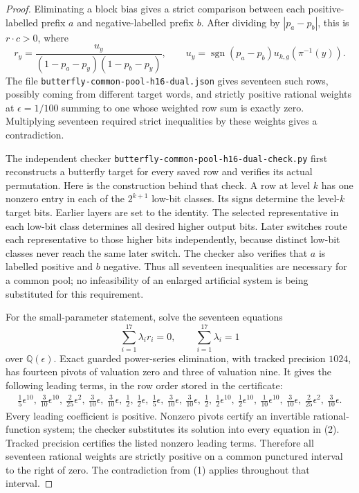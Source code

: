 \documentclass[11pt]{article}
\begin{document}
\begin{proof}
Eliminating a block bias gives a strict comparison between each
positive-labelled prefix $a$ and negative-labelled prefix $b$.
After dividing by $|p_a-p_b|$, this is $r\cdot c>0$, where
\[
 r_y=\frac{u_y}{(1-p_a-p_y)(1-p_b-p_y)},\qquad
 u_y=\operatorname{sgn}(p_a-p_b)
       u_{k,g}(\pi^{-1}(y)).                                  \tag{1}
\]
The file \texttt{butterfly-common-pool-h16-dual.json} gives seventeen
such rows, possibly coming from different target words, and strictly
positive rational weights at $\epsilon=1/100$ summing to one whose
weighted row sum is exactly zero. Multiplying seventeen required
strict inequalities by these weights gives a contradiction.

The independent checker
\texttt{butterfly-common-pool-h16-dual-check.py} first reconstructs a
butterfly target for every saved row and verifies its actual permutation.
Here is the construction behind that check. A row at level $k$ has one
nonzero entry in each of the $2^{k+1}$ low-bit classes. Its signs determine
the level-$k$ target bits. Earlier layers are set to the identity.
The selected representative in each low-bit class determines all desired
higher output bits. Later switches route each representative to those
higher bits independently, because distinct low-bit classes never reach
the same later switch. The checker also verifies that $a$ is labelled
positive and $b$ negative. Thus all seventeen inequalities are necessary
for a common pool; no infeasibility of an enlarged artificial system is
being substituted for this requirement.

For the small-parameter statement, solve the seventeen equations
\[
 \sum_{i=1}^{17}\lambda_i r_i=0,\qquad
 \sum_{i=1}^{17}\lambda_i=1                                  \tag{2}
\]
over $\mathbb Q(\epsilon)$. Exact guarded power-series elimination,
with tracked precision $1024$, has fourteen pivots of valuation zero
and three of valuation nine. It gives the following leading terms,
in the row order stored in the certificate:
\[
\begin{gathered}
 \tfrac15\epsilon^{10},\ \tfrac3{10}\epsilon^{10},\
 \tfrac2{25}\epsilon^2,\ \tfrac3{10}\epsilon,\
 \tfrac3{10}\epsilon,\ \tfrac12,\ \tfrac12\epsilon,\
 \tfrac15\epsilon,\ \tfrac3{10}\epsilon,\
 \tfrac3{10}\epsilon,\ \tfrac12,\ \tfrac12\epsilon^{10},\
 \tfrac12\epsilon^{10},\ \tfrac1{10}\epsilon^{10},\
 \tfrac3{10}\epsilon,\ \tfrac2{25}\epsilon^2,\
 \tfrac3{10}\epsilon.
\end{gathered}
\]
Every leading coefficient is positive. Nonzero pivots certify an
invertible rational-function system; the checker substitutes its
solution into every equation in (2). Tracked precision certifies the
listed nonzero leading terms. Therefore all seventeen rational weights
are strictly positive on a common punctured interval to the right of
zero. The contradiction from (1) applies throughout that interval.
\end{proof}
\end{document}
